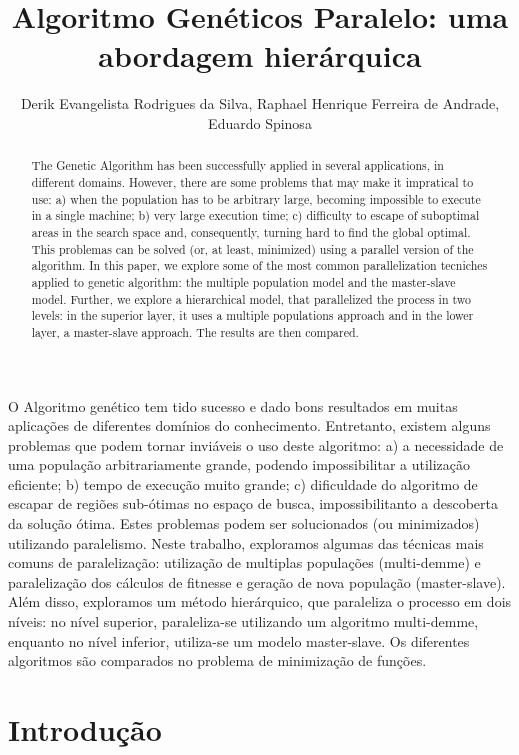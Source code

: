 \documentclass[12pt]{article}
\title{Algoritmo Genéticos Paralelo: uma abordagem hierárquica}
\author{Derik Evangelista Rodrigues da Silva\inst{1}, Raphael Henrique Ferreira de Andrade\inst{1}, \\Eduardo Spinosa\inst{1}}
\begin{document}
 

\maketitle

\begin{abstract}
    The Genetic Algorithm has been successfully applied in several applications, in different domains. However, there are some problems that may make it impratical to use: a)  when the population has to be arbitrary large, becoming  impossible to execute in a single machine; b) very large execution time; c) difficulty to escape of suboptimal areas in the search space and, consequently, turning hard to find the global optimal. This problemas can be solved (or, at least, minimized) using a parallel version of the algorithm. In this paper, we explore some of the most common parallelization tecniches applied to genetic algorithm: the multiple population model and the master-slave model. Further, we explore a hierarchical model, that parallelized the process in two levels: in the superior layer, it uses a multiple populations approach and in the lower layer, a master-slave approach. The results are then compared. 
\end{abstract}
     
\begin{resumo} 
  O Algoritmo genético tem tido sucesso e dado bons resultados em muitas aplicações de diferentes domínios do conhecimento. Entretanto, existem alguns problemas que podem tornar inviáveis o uso deste algoritmo: a) a necessidade de uma população arbitrariamente grande, podendo impossibilitar a utilização eficiente; b) tempo de execução muito grande; c) dificuldade do algoritmo de escapar de regiões sub-ótimas no espaço de busca, impossibilitanto a descoberta da solução ótima. Estes problemas podem ser solucionados (ou minimizados) utilizando paralelismo. Neste trabalho, exploramos algumas das técnicas mais comuns de paralelização: utilização de multiplas populações (multi-demme) e paralelização dos cálculos de fitnesse e geração de nova população (master-slave). Além disso, exploramos um método hierárquico, que paraleliza o processo em dois níveis: no nível superior, paraleliza-se utilizando um algoritmo multi-demme, enquanto no nível inferior, utiliza-se um modelo master-slave. Os diferentes algoritmos são comparados no problema de minimização de funções.
\end{resumo}


\section{Introdução}
\end{document}
